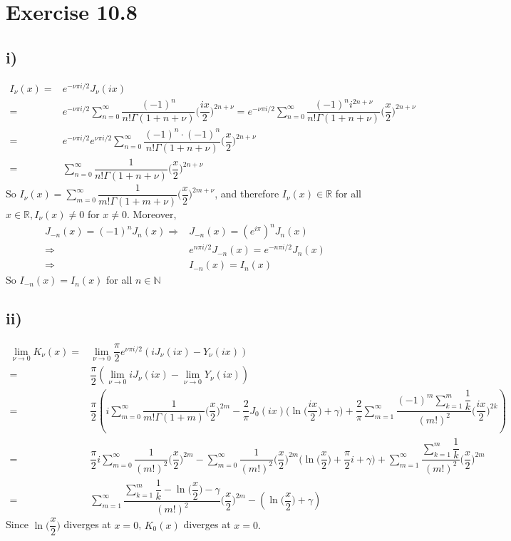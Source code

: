 \documentclass[a4paper,12pt,titlepage]{article}
\begin{document}
\section*{Exercise 10.8}
\subsection*{i)}
\begin{align*}
I_{\nu}(x)=&e^{-\nu\pi i/2}J_{\nu}(ix)\\
=&e^{-\nu\pi i/2}\sum\limits_{n=0}^{\infty}\dfrac{(-1)^n}{n!\Gamma(1+n+\nu)}\Big(\dfrac{ix}{2}\Big)^{2n+\nu}=e^{-\nu\pi i/2}\sum\limits_{n=0}^{\infty}\dfrac{(-1)^ni^{2n+\nu}}{n!\Gamma(1+n+\nu)}\Big(\dfrac{x}{2}\Big)^{2n+\nu}\\
=&e^{-\nu\pi i/2}e^{\nu\pi i/2}\sum\limits_{n=0}^{\infty}\dfrac{(-1)^n\cdot(-1)^n}{n!\Gamma(1+n+\nu)}\Big(\dfrac{x}{2}\Big)^{2n+\nu}\\
=&\sum\limits_{n=0}^{\infty}\dfrac{1}{n!\Gamma(1+n+\nu)}\Big(\dfrac{x}{2}\Big)^{2n+\nu}
\end{align*}
So $I_{\nu}(x)=\sum\limits_{m=0}^{\infty}\dfrac{1}{m!\Gamma(1+m+\nu)}\Big(\dfrac{x}{2}\Big)^{2m+\nu}$, and therefore $I_{\nu}(x) \in\mathbb{R}$  for all $x \in \mathbb{R}, I_{\nu}(x) \neq 0$ for $x \neq 0$.  Moreover, 
\begin{align*}
J_{-n}(x)=(-1)^nJ_n(x)\Rightarrow& J_{-n}(x)=(e^{i\pi })^nJ_n(x)\\
\Rightarrow& e^{n\pi i/2}J_{-n}(x)=e^{-n\pi i/2}J_n(x)\\
\Rightarrow& I_{-n}(x)=I_n(x)
\end{align*}
So $I_{-n}(x)=I_n(x)$ for all $n\in\mathbb{N}$
\subsection*{ii)}
\begin{align*}
\lim_{\nu\rightarrow0}K_{\nu}(x)=&\lim_{\nu\rightarrow0}\dfrac{\pi}{2}e^{\nu \pi i/2}(iJ_{\nu}(ix)-Y_{\nu}(ix))\\
=&\dfrac{\pi}{2}(\lim_{\nu\rightarrow0}iJ_{\nu}(ix)-\lim_{\nu\rightarrow0}Y_{\nu}(ix))\\
=&\dfrac{\pi}{2}(i\sum\limits_{m=0}^{\infty}\dfrac{1}{m!\Gamma(1+m)}\Big(\dfrac{x}{2}\Big)^{2m}-\dfrac{2}{\pi}J_0(ix)\Big(\ln\Big(\dfrac{ix}{2}\Big)+\gamma\Big)+\dfrac{2}{\pi}\sum\limits_{m=1}^{\infty}\dfrac{(-1)^m\sum\limits_{k=1}^m\dfrac{1}{k}}{(m!)^2}\Big(\dfrac{ix}{2}\Big)^{2k})\\
=&\dfrac{\pi}{2}i\sum\limits_{m=0}^{\infty}\dfrac{1}{(m!)^2}\Big(\dfrac{x}{2}\Big)^{2m}-\sum\limits_{m=0}^{\infty}\dfrac{1}{(m!)^2}\Big(\dfrac{x}{2}\Big)^{2m}\Big(\ln\Big(\dfrac{x}{2}\Big)+\dfrac{\pi}{2}i+\gamma\Big)+\sum\limits_{m=1}^{\infty}\dfrac{\sum\limits_{k=1}^m\dfrac{1}{k}}{(m!)^2}\Big(\dfrac{x}{2}\Big)^{2m}\\
=&\sum\limits_{m=1}^{\infty}\dfrac{\sum\limits_{k=1}^m\dfrac{1}{k}-\ln\Big(\dfrac{x}{2}\Big)-\gamma}{(m!)^2}\Big(\dfrac{x}{2}\Big)^{2m}-(\ln\Big(\dfrac{x}{2}\Big)+\gamma)
\end{align*}
Since $\ln\Big(\dfrac{x}{2}\Big)$ diverges at $x=0$, $K_0(x)$ diverges at $x=0.$
\end{document}
